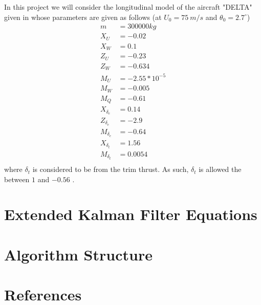 \documentclass{article}
\begin{document}
In this project we will consider the longitudinal model of the aircraft "DELTA" given in \cite[PP. 561--563]{Mclean}
whose parameters are given as follows (at $U_0 = 75~ m/s$ and $\theta_0 = 2.7 ^\circ$)
\begin{equation}\label{Eq:DELTA_Params}
    \begin{split}
        m &= 300000 kg\\
        X_U &= -0.02\\
        X_W &= 0.1\\
        Z_U &= -0.23\\
        Z_W &= -0.634\\
        M_U &= -2.55*10^{-5}\\
        M_W &= -0.005\\
        M_Q &= -0.61\\
        X_{\delta_e} &= 0.14\\
        Z_{\delta_e} &= -2.9\\
        M_{\delta_e} &= -0.64\\
        X_{\delta_t} &= 1.56\\
        M_{\delta_t} &= 0.0054\\
    \end{split}
\end{equation}
where $\delta_t$ is considered to be from the trim thrust. 
As such, $\delta_t$ is allowed the between $1$ and $-0.56$ \cite{Hassan2016_JAST}.  

\section{Extended Kalman Filter Equations}

\section{Algorithm Structure}

\section*{References}


\end{document}
